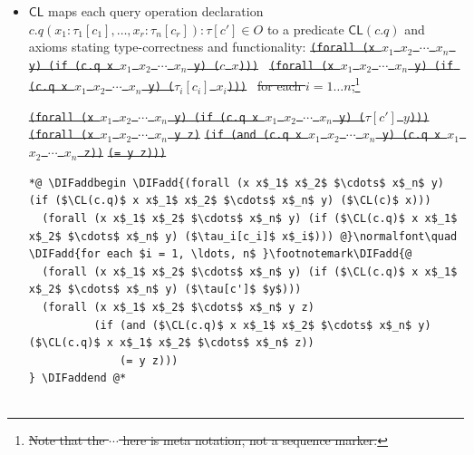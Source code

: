 \documentclass[10pt,fleqn,final]{scrreprt}
\newcommand*{\CL}{\ensuremath{\mathsf{CL}}\xspace}
\newcommand{\white}[1]{{\color{white}{#1}}}
\newcommand{\qqquad}{\white{x}\qquad}
\providecommand{\DIFadd}[1]{{\protect\color{blue}\uwave{#1}}} %
\providecommand{\DIFdel}[1]{{\protect\color{red}\sout{#1}}}                      %
\providecommand{\DIFaddbegin}{} %
\providecommand{\DIFaddend}{} %
\providecommand{\DIFdelbegin}{} %
\providecommand{\DIFdelend}{} %
\begin{document}
\begin{itemize}[topsep=0pt, label=--, leftmargin=*]
   \item $\CL$
maps each query operation declaration
$c.q(x_1 : \tau_1[c_1], \dots, x_r : \tau_n[c_r]) : \tau[c'] \in O$
to a predicate $\CL(c.q)$
and axioms stating type-correctness and functionality:
\DIFdelbegin %
\texttt{\DIFdel{(forall (x $x_1$ $x_2$ $\cdots$  $x_n$ y) (if (c.q x $x_1$ $x_2$ $\cdots$  $x_n$ y) ($c$ $x$))) }}
\texttt{\DIFdel{(forall (x $x_1$ $x_2$ $\cdots$  $x_n$ y) (if (c.q x $x_1$ $x_2$ $\cdots$  $x_n$ y) ($\tau_i[c_i]$ $x_i$))) }}
\DIFdel{for each $i=1\ldots n$,}\footnote{\DIFdel{Note that the $\cdots$ here is meta notation, not a sequence marker.}}
\addtocounter{footnote}{-1}%
\texttt{\DIFdel{(forall (x $x_1$ $x_2$ $\cdots$  $x_n$ y) (if (c.q x $x_1$ $x_2$ $\cdots$  $x_n$ y) ($\tau[c']$ $y$))) }}
\texttt{\DIFdel{(forall (x $x_1$ $x_2$ $\cdots$  $x_n$ y z)}}%
\texttt{\DIFdel{(if (and (c.q x $x_1$ $x_2$ $\cdots$  $x_n$ y) (c.q x $x_1$ $x_2$ $\cdots$  $x_n$ z))}}%
\texttt{\DIFdel{(= y z)))}}
\DIFdelend %
 \begin{lstlisting}[language=clif, mathescape, escapechar=@]
 *@ \DIFaddbegin \DIFadd{(forall (x x$_1$ x$_2$ $\cdots$ x$_n$ y) (if ($\CL(c.q)$ x x$_1$ x$_2$ $\cdots$ x$_n$ y) ($\CL(c)$ x)))
  (forall (x x$_1$ x$_2$ $\cdots$ x$_n$ y) (if ($\CL(c.q)$ x x$_1$ x$_2$ $\cdots$ x$_n$ y) ($\tau_i[c_i]$ x$_i$))) @}\normalfont\quad \DIFadd{for each $i = 1, \ldots, n$ }\footnotemark\DIFadd{@
  (forall (x x$_1$ x$_2$ $\cdots$ x$_n$ y) (if ($\CL(c.q)$ x x$_1$ x$_2$ $\cdots$ x$_n$ y) ($\tau[c']$ $y$)))
  (forall (x x$_1$ x$_2$ $\cdots$ x$_n$ y z)
          (if (and ($\CL(c.q)$ x x$_1$ x$_2$ $\cdots$ x$_n$ y) ($\CL(c.q)$ x x$_1$ x$_2$ $\cdots$ x$_n$ z))
              (= y z)))
} \DIFaddend @*


\end{lstlisting}
\end{itemize}
\end{document}
